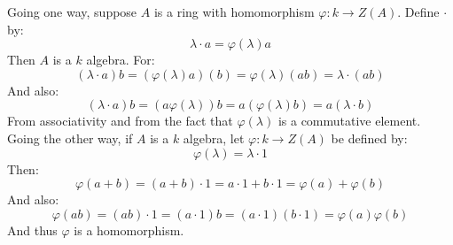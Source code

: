 \documentclass[crop=false,class=article]{standalone}                       %
\begin{document}
    \begin{solution}
        Going one way, suppose $A$ is a ring with homomorphism
        $\varphi:k\rightarrow{Z}(A)$. Define $\cdot$ by:
        \begin{equation}
            \lambda\cdot{a}=\varphi(\lambda)a
        \end{equation}
        Then $A$ is a $k$ algebra. For:
        \begin{equation}
            (\lambda\cdot{a})b
            =(\varphi(\lambda)a)(b)
            =\varphi(\lambda)(ab)
            =\lambda\cdot(ab)
        \end{equation}
        And also:
        \begin{equation}
            (\lambda\cdot{a})b
            =(a\varphi(\lambda))b
            =a(\varphi(\lambda)b)
            =a(\lambda\cdot{b})
        \end{equation}
        From associativity and from the fact that $\varphi(\lambda)$ is
        a commutative element. Going the other way, if $A$ is a $k$ algebra,
        let $\varphi:k\rightarrow{Z}(A)$ be defined by:
        \begin{equation}
            \varphi(\lambda)=\lambda\cdot{1}
        \end{equation}
        Then:
        \begin{equation}
            \varphi(a+b)
            =(a+b)\cdot{1}
            =a\cdot{1}+b\cdot{1}
            =\varphi(a)+\varphi(b)
        \end{equation}
        And also:
        \begin{equation}
            \varphi(ab)
            =(ab)\cdot{1}
            =(a\cdot{1})b
            =(a\cdot{1})(b\cdot{1})
            =\varphi(a)\varphi(b)
        \end{equation}
        And thus $\varphi$ is a homomorphism.
    \end{solution}
\end{document}

